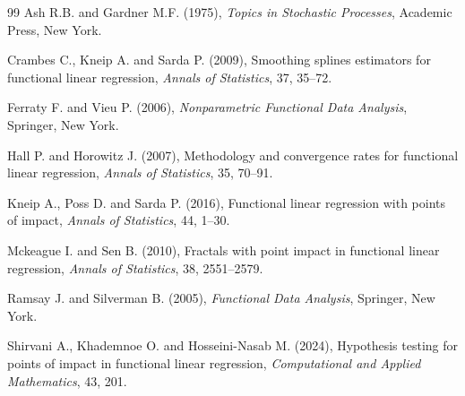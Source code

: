 \documentclass[twoside]{article}
\begin{document}
\begin{thebibliography}{99}
Ash R.B. and Gardner M.F. (1975),
{\it Topics in Stochastic Processes},
Academic Press, New York.

Crambes C., Kneip A. and Sarda P. (2009), Smoothing splines estimators for functional linear regression, {\it Annals of Statistics}, 37, 35--72.

Ferraty F. and Vieu P. (2006), {\it Nonparametric Functional Data Analysis}, Springer, New York.

Hall P. and Horowitz J. (2007), Methodology and convergence rates for functional linear regression, {\it Annals of Statistics}, 35, 70--91.

Kneip A., Poss D. and Sarda P. (2016), Functional linear regression with points of impact, {\it Annals of Statistics}, 44, 1--30.

Mckeague I. and Sen B. (2010), Fractals with point impact in functional linear regression, {\it Annals of Statistics}, 38, 2551--2579.

Ramsay J. and Silverman B. (2005), {\it Functional Data Analysis}, Springer, New York.

Shirvani A., Khademnoe O. and Hosseini-Nasab M. (2024), Hypothesis testing for points of impact in functional linear regression, {\it Computational and Applied Mathematics}, 43, 201.

\end{thebibliography}
\end{document}
